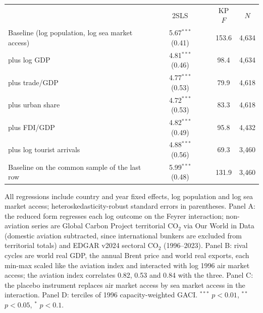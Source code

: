 \begin{table}[htbp]
\begin{threeparttable}
\begin{tabular}{lcccc}
 & 2SLS & & KP $F$ & $N$ \\
  Baseline (log population, log sea market access) & 5.67$^{***}$ (0.41) & & 153.6 & 4,634 \\
  \quad plus log GDP & 4.81$^{***}$ (0.46) & & 98.4 & 4,634 \\
  \quad plus trade/GDP & 4.77$^{***}$ (0.53) & & 79.9 & 4,618 \\
  \quad plus urban share & 4.72$^{***}$ (0.53) & & 83.3 & 4,618 \\
  \quad plus FDI/GDP & 4.82$^{***}$ (0.49) & & 95.8 & 4,432 \\
  \quad plus log tourist arrivals & 4.88$^{***}$ (0.56) & & 69.3 & 3,460 \\
  Baseline on the common sample of the last row & 5.99$^{***}$ (0.48) & & 131.9 & 3,460 \\
\bottomrule
\end{tabular}
\begin{tablenotes}\scriptsize
\item All regressions include country and year fixed effects, log population and log sea market access; heteroskedasticity-robust standard errors in parentheses. Panel A: the reduced form regresses each log outcome on the Feyrer interaction; non-aviation series are Global Carbon Project territorial CO$_2$ via Our World in Data (domestic aviation subtracted, since international bunkers are excluded from territorial totals) and EDGAR v2024 sectoral CO$_2$ (1996--2023). Panel B: rival cycles are world real GDP, the annual Brent price and world real exports, each min-max scaled like the aviation index and interacted with log 1996 air market access; the aviation index correlates 0.82, 0.53 and 0.84 with the three. Panel C: the placebo instrument replaces air market access by sea market access in the interaction. Panel D: terciles of 1996 capacity-weighted GACI. $^{***}$ $p<0.01$, $^{**}$ $p<0.05$, $^{*}$ $p<0.1$.
\end{tablenotes}
\end{threeparttable}
\end{table}

